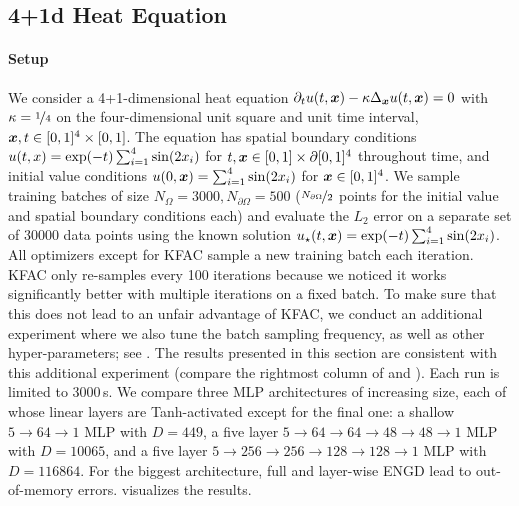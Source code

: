 \subsection{4+1d Heat Equation}\label{sec:4d-heat-app}

\paragraph{Setup} We consider a 4+1-dimensional heat equation $\partial_tu(t,{\bm{x}}) - \kappa \Delta_{{\bm{x}}} u(t, {\bm{x}}) = 0$ with $\kappa = \nicefrac{1}{4}$ on the four-dimensional unit square and unit time interval, ${\bm{x}}, t \in [0,1]^4 \times [0,1]$.
The equation has spatial boundary conditions $u(t, x) = \exp(-t) \sum_{i=1}^4 \sin( 2 {x}_i)$ for $t, {\bm{x}} \in [0,1] \times \partial [0,1]^4$ throughout time, and initial value conditions $u(0, {\bm{x}}) = \sum_{i=1}^4 \sin(2 {x}_i)$ for ${\bm{x}} \in [0,1]^4$.
We sample training batches of size $N_{\Omega} = \num{3000}, N_{\partial\Omega} = 500$ ($\nicefrac{N_{\partial\Omega}}{2}$ points for the initial value and spatial boundary conditions each) and evaluate the $L_2$ error on a separate set of $\num{30000}$ data points using the known solution $u_{\star}(t, {\bm{x}}) = \exp(-t) \sum_{i=1}^4 \sin(2 {x}_i)$.
All optimizers except for KFAC sample a new training batch each iteration.
KFAC only re-samples every 100 iterations because we noticed it works significantly better with multiple iterations on a fixed batch.
To make sure that this does not lead to an unfair advantage of KFAC, we conduct an additional experiment where we also tune the batch sampling frequency, as well as other hyper-parameters; see .
The results presented in this section are consistent with this additional experiment (compare the rightmost column of  and ).
Each run is limited to 3000\,s.
We compare three MLP architectures of increasing size, each of whose linear layers are Tanh-activated except for the final one: a shallow $5\to 64\to 1$ MLP with $D=449$, a five layer $5 \to 64 \to 64 \to 48 \to 48 \to 1$ MLP with $D=\num{10065}$, and a five layer $5 \to 256 \to 256\to 128 \to 128 \to 1$ MLP with $D=\num{116864}$.
For the biggest architecture, full and layer-wise ENGD lead to out-of-memory errors.
 visualizes the results.

